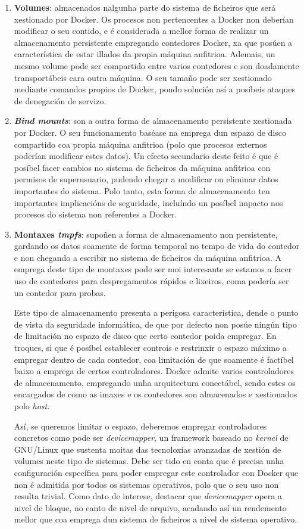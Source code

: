 \begin{enumerate}
    \item \textbf{Volumes}: almacenados nalgunha parte do sistema de ficheiros que será xestionado por Docker. Os procesos non pertencentes a Docker non deberían modificar o seu contido, e é considerada a mellor forma de realizar un almacenamento persistente empregando contedores Docker, xa que posúen a característica de estar illados da propia máquina anfitrioa. Ademais, un mesmo volume pode ser compartido entre varios contedores e son doadamente transportábeis cara outra máquina. O seu tamaño pode ser xestionado mediante comandos propios de Docker, pondo solución así a posíbeis ataques de denegación de servizo.
    \item \textbf{\textit{Bind mounts}}: son a outra forma de almacenamento persistente xestionada por Docker. O seu funcionamento baséase na emprega dun espazo de disco compartido coa propia máquina anfitrioa (polo que procesos externos poderían modificar estes datos). Un efecto secundario deste feito é que é posíbel facer cambios no sistema de ficheiros da máquina anfitrioa con permisos de superusuario, pudendo chegar a modificar ou eliminar datos importantes do sistema. Polo tanto, esta forma de almacenamento ten importantes implicacións de seguridade, incluíndo un posíbel impacto nos procesos do sistema non referentes a Docker.
    \item \textbf{Montaxes \textit{tmpfs}}: supoñen a forma de almacenamento non persistente, gardando os datos soamente de forma temporal no tempo de vida do contedor e non chegando a escribir no sistema de ficheiros da máquina anfitrioa. A emprega deste tipo de montaxes pode ser moi interesante se estamos a facer uso de contedores para despregamentos rápidos e lixeiros, coma podería ser un contedor para probas.
    
    Este tipo de almacenamento presenta a perigosa característica, dende o punto de vista da seguridade informática, de que por defecto non posúe ningún tipo de limitación no espazo de disco que certo contedor poida empregar. En troques, si que é posíbel establecer controis e restrinxir o espazo máximo a empregar dentro de cada contedor, coa limitación de que soamente é factíbel baixo a emprega de certos controladores. Docker admite varios controladores de almacenamento, empregando unha arquitectura conectábel, sendo estes os encargados de como as imaxes e os contedores son almacenados e xestionados polo \textit{host}.
    
    Así, se queremos limitar o espazo, deberemos empregar controladores concretos como pode ser \textit{devicemapper}, un framework baseado no \textit{kernel} de GNU/Linux que sustenta moitas das tecnoloxías avanzadas de xestión de volumes neste tipo de sistemas. Debe ser tido en conta que é precisa unha configuración específica para poder empregar este controlador con Docker que non é admitida por todos os sistemas operativos, polo que o seu uso non resulta trivial. Como dato de interese, destacar que \textit{devicemapper} opera a nivel de bloque, no canto de nivel de arquivo, acadando así un rendemento mellor que coa emprega dun sistema de ficheiros a nivel de sistema operativo.
    

\end{enumerate}

